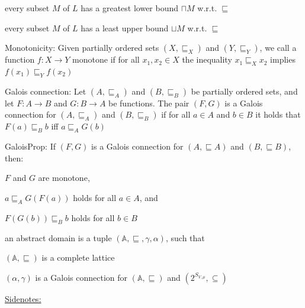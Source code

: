 \documentclass[landscape, a4paper]{article}
\begin{document}
\begin{minipage}[t]{0.2\linewidth}
\begin{betterlist}
\begin{betterlist}
			\item every subset $M$ of $L$ has a \alert{greatest lower bound} $\sqcap M$ w.r.t. $\sqsubseteq$
			\item every subset $M$ of $L$ has a \alert{least upper bound} $\sqcup M$ w.r.t. $\sqsubseteq$
			\item {}
		\end{betterlist}
		\item \alert{Monotonicity:} Given partially ordered sets $(X, \sqsubseteq_X)$ and $(Y, \sqsubseteq_Y)$, we call a function $f:X\rightarrow Y$ \alert{monotone} if for all $x_1, x_2 \in X$ the inequality $x_1 \sqsubseteq_X x_2$ implies $f(x_1) \sqsubseteq_Y f(x_2)$
		\begin{betterlist}
			\item {}
		\end{betterlist}
		\item \color{orange}\alert{Galois connection:} Let $(A, \sqsubseteq_A)$ and $(B, \sqsubseteq_B)$ be partially ordered sets, and let $F : A \rightarrow B$ and $G : B \rightarrow A$ be functions. The pair $(F, G)$ is a Galois connection for $(A, \sqsubseteq_A)$ and $(B, \sqsubseteq_B)$ if for all $a \in A$ and $b \in B$ it holds that $F(a) \sqsubseteq_B b$ iff $a \sqsubseteq_A G(b)$\color{black}
		\item \color{orange}\alert{GaloisProp:} If $(F, G)$ is a \alert{Galois connection} for $(A, \sqsubseteq A)$ and $(B, \sqsubseteq B)$, then:
		\begin{betterlist}
			\item $F$ and $G$ are \alert{monotone},
			\item $a \sqsubseteq_A G(F(a))$ holds for all $a \in A$, and
			\item $F(G(b)) \sqsubseteq_B b$ holds for all $b \in B$
			\item \script{394}{Proof}
		\end{betterlist}\color{black}
		\item \color{orange}an \alert{abstract domain} is a tuple $(\mathbb{A}, \sqsubseteq, \gamma, \alpha)$, such that
		\begin{betterlist}
			\item $(\mathbb{A}, \sqsubseteq)$ is a complete lattice
			\item $(\alpha, \gamma)$ is a Galois connection for $(\mathbb{A}, \sqsubseteq)$ and $(2^{S_{V ,\mu}}, \subseteq)$
			\item \underline{Sidenotes:}
			\begin{betterlist}

\end{betterlist}
\end{betterlist}
\end{betterlist}
\end{minipage}
\end{document}
